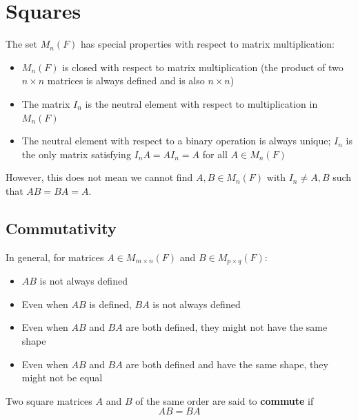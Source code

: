 \section{Squares}
\begin{note}
    The set $M_n(F)$ has special properties with respect to matrix multiplication:
    \begin{itemize}
        \item $M_n(F)$ is closed with respect to matrix multiplication (the product of two $n \times n$ matrices is always defined and is also $n \times n$)
        \item The matrix $I_n$ is the neutral element with respect to multiplication in $M_n(F)$
        \item The neutral element with respect to a binary operation is always unique; $I_n$ is the only matrix satisfying $I_n A = AI_n = A$ for all $A \in M_n(F)$
    \end{itemize}
\end{note}

\begin{note}
    However, this does not mean we cannot find $A, B \in M_n(F)$ with $I_n \neq A, B$ such that $AB = BA = A$.
\end{note}

\subsection{Commutativity}

\begin{note}
    In general, for matrices $A \in M_{m \times n}(F)$ and $B \in M_{p \times q}(F)$:
    \begin{itemize}
        \item $AB$ is not always defined
        \item Even when $AB$ is defined, $BA$ is not always defined
        \item Even when $AB$ and $BA$ are both defined, they might not have the same shape
        \item Even when $AB$ and $BA$ are both defined and have the same shape, they might not be equal
    \end{itemize}
\end{note}

\begin{definition}\label{def:commuting-matrices}
    Two square matrices $A$ and $B$ of the same order are said to \textbf{commute} if
    \[
    AB = BA
    \]
\end{definition}

